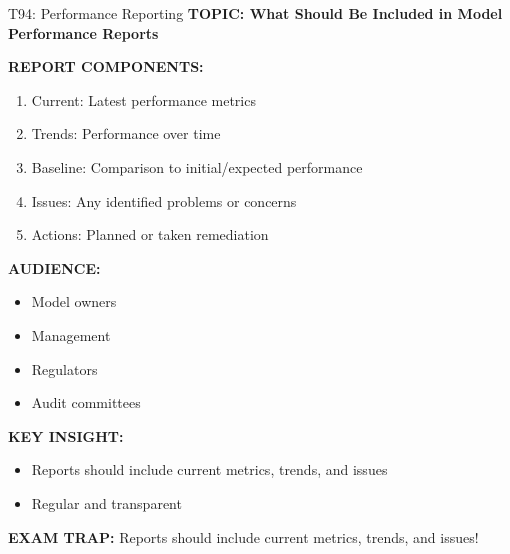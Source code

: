\documentclass[8pt]{beamer}
\begin{document}
	\begin{frame}{T94: Performance Reporting}
		\fontsize{6.5}{7.5}\selectfont
		\textbf{TOPIC: What Should Be Included in Model Performance Reports}
		
		\vspace{0.1cm}
		\textbf{REPORT COMPONENTS:}
		\begin{enumerate}
			\item \textcolor{myblue}{Current:} Latest performance metrics
			\item \textcolor{myblue}{Trends:} Performance over time
			\item \textcolor{myblue}{Baseline:} Comparison to initial/expected performance
			\item \textcolor{myblue}{Issues:} Any identified problems or concerns
			\item \textcolor{myblue}{Actions:} Planned or taken remediation
		\end{enumerate}
		
		\vspace{0.1cm}
		\textbf{AUDIENCE:}
		\begin{itemize}
			\item Model owners
			\item Management
			\item Regulators
			\item Audit committees
		\end{itemize}
		
		\vspace{0.1cm}
		\textbf{KEY INSIGHT:}
		\begin{itemize}
			\item Reports should include current metrics, trends, and issues
			\item Regular and transparent
		\end{itemize}
		
		\textcolor{myred}{\textbf{EXAM TRAP:}} Reports should include \textcolor{myblue}{current metrics, trends, and issues}!
	\end{frame}
	
\end{document}
